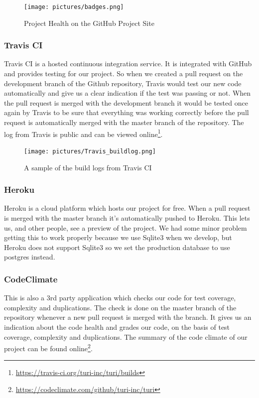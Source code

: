\documentclass[a4paper]{article}
\begin{document}
\begin{figure}[!h]
  \begin{center}
    \texttt{[image: pictures/badges.png]}
    \caption{Project Health on the GitHub Project Site}
    \label{fig:badges}
  \end{center}
\end{figure}


\subsubsection{Travis CI}
Travis CI is a hosted continuous integration service. It is integrated with GitHub and provides testing for our project. So when we created a pull request on the development branch of the Github repository, Travis would test our new code automatically and give us a clear indication if the test was passing or not. When the pull request is merged with the development branch it would be tested once again by Travis to be sure that everything was working correctly before the pull request is automatically merged with the master branch of the repository. The log from Travis is public and can be viewed online\footnote{\url{https://travis-ci.org/turi-inc/turi/builds}}.

\begin{figure}[!h]
  \begin{center}
    \texttt{[image: pictures/Travis\_buildlog.png]}
    \caption{A sample of the build logs from Travis CI}
    \label{fig:travis_log}
  \end{center}
\end{figure}


\subsubsection{Heroku}
Heroku is a cloud platform which hosts our project for free. When a pull request is merged with the master branch it's automatically pushed to Heroku. This lets us, and other people, see a preview of the project. We had some minor problem getting this to work properly because we use Sqlite3 when we develop, but Heroku does not support Sqlite3 so we set the production database to use postgres instead.

\subsubsection{CodeClimate}
This is also a 3rd party application which checks our code for test coverage, complexity and duplications. The check is done on the master branch of the repository whenever a new pull request is merged with the branch. It gives us an indication about the code health and grades our code, on the basis of test coverage, complexity and duplications. The summary of the code climate of our project can be found online\footnote{\url{https://codeclimate.com/github/turi-inc/turi}}. \\
\end{document}
